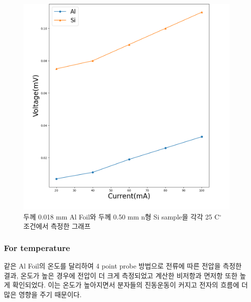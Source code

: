 \documentclass[aps,reprint,superscriptaddress,10pt]{revtex4-2}
\begin{document}
\begin{figure}[htbp]
  \vspace{0.5cm}
  \centering
  \includegraphics[scale = 0.25]{AlSi.png}
  \caption{두께 0.018 mm Al Foil와 두께 0.50 mm
  n형 Si sample을 각각 25 C$^\circ$ 조건에서
  측정한 그래프}
  \label{AlSi}
\end{figure}



\subsubsection{For temperature}
같은 Al Foil의 온도를 달리하여 4 point probe 방법으로 전류에 따른 전압을
측정한 결과, 온도가 높은 경우에 전압이 더 크게 측정되었고 계산한 비저항과 
면저항 또한 높게 확인되었다. 이는 온도가 높아지면서 분자들의 진동운동이 커지고
전자의 흐름에 더 많은 영향을 주기 때문이다.
\end{document}
